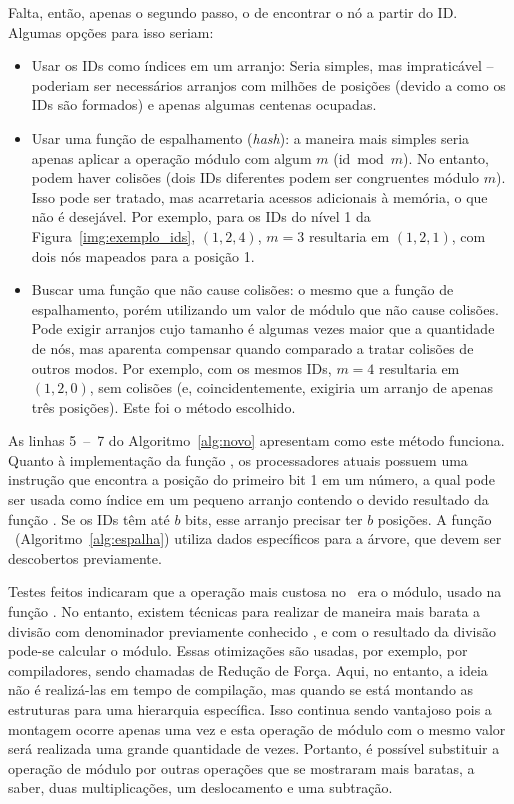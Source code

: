 


Falta, então, apenas o segundo passo, o de encontrar o nó a partir do ID.
Algumas opções para isso seriam:
\begin{itemize}
	\item Usar os IDs como índices em um arranjo: Seria simples, mas impraticável -- poderiam ser necessários arranjos com milhões de posições (devido a como os IDs são formados) e apenas algumas centenas ocupadas.
	\item Usar uma função de espalhamento (\textit{hash}): a maneira mais simples seria apenas aplicar a operação módulo com algum $m$ ($\mathrm{id} \bmod m$).
	No entanto, podem haver colisões (dois IDs diferentes podem ser congruentes módulo $m$).
	Isso pode ser tratado, mas acarretaria acessos adicionais à memória, o que não é desejável.
	Por exemplo, para os IDs do nível 1 da Figura~\ref{img:exemplo_ids}, $(1, 2, 4)$, $m = 3$ resultaria em $(1, 2, 1)$, com dois nós mapeados para a posição 1.
	\item Buscar uma função que não cause colisões: o mesmo que a função de espalhamento, porém utilizando um valor de módulo que não cause colisões.
	Pode exigir arranjos cujo tamanho é algumas vezes maior que a quantidade de nós, mas aparenta compensar quando comparado a tratar colisões de outros modos.
	Por exemplo, com os mesmos IDs, $m = 4$ resultaria em $(1, 2, 0)$, sem colisões (e, coincidentemente, exigiria um arranjo de apenas três posições).
	Este foi o método escolhido.
\end{itemize}

As linhas 5~--~7 do Algoritmo~\ref{alg:novo} apresentam como este método funciona.
Quanto à implementação da função \bpn, os processadores atuais possuem uma instrução que encontra a posição do primeiro bit 1 em um número, a qual pode ser usada como índice em um pequeno arranjo contendo o devido resultado da função \bpn.
Se os IDs têm até $b$ bits, esse arranjo precisar ter $b$ posições.
A função \Espalha\ (Algoritmo~\ref{alg:espalha}) utiliza dados específicos para a árvore, que devem ser descobertos previamente.

Testes feitos indicaram que a operação mais custosa no \Novo\ era o módulo, usado na função \Espalha.
No entanto, existem técnicas para realizar de maneira mais barata a divisão com denominador previamente conhecido \cite{reciproco}, e com o resultado da divisão pode-se calcular o módulo.
Essas otimizações são usadas, por exemplo, por compiladores, sendo chamadas de Redução de Força.
Aqui, no entanto, a ideia não é realizá-las em tempo de compilação, mas quando se está montando as estruturas para uma hierarquia específica.
Isso continua sendo vantajoso pois a montagem ocorre apenas uma vez e esta operação de módulo com o mesmo valor será realizada uma grande quantidade de vezes.
Portanto, é possível substituir a operação de módulo por outras operações que se mostraram mais baratas, a saber, duas multiplicações, um deslocamento e uma subtração.

